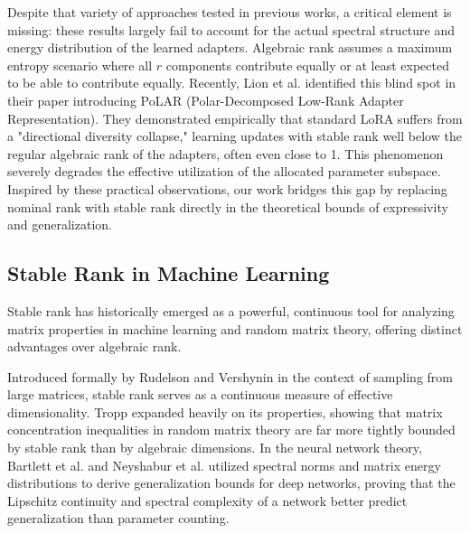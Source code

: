 \documentclass[a4paper,14pt]{extarticle}
\begin{document}
    Despite that variety of approaches tested in previous works, a critical element is missing: these results largely fail to account for the actual spectral structure and energy distribution of the learned adapters. Algebraic rank assumes a maximum entropy scenario where all $r$ components contribute equally or at least expected to be able to contribute equally. Recently, Lion et al. \cite{lion2025polar} identified this blind spot in their paper introducing PoLAR (Polar-Decomposed Low-Rank Adapter Representation). They demonstrated empirically that standard LoRA suffers from a "directional diversity collapse," learning updates with stable rank well below the regular algebraic rank of the adapters, often even close to 1. This phenomenon severely degrades the effective utilization of the allocated parameter subspace. Inspired by these practical observations, our work bridges this gap by replacing nominal rank with stable rank directly in the theoretical bounds of expressivity and generalization.


    \subsection{Stable Rank in Machine Learning}
    
    Stable rank has historically emerged as a powerful, continuous tool for analyzing matrix properties in machine learning and random matrix theory, offering distinct advantages over algebraic rank. 

    Introduced formally by Rudelson and Vershynin \cite{rudelson2007sampling} in the context of sampling from large matrices, stable rank serves as a continuous measure of effective dimensionality. Tropp \cite{tropp2012user, tropp2015introduction} expanded heavily on its properties, showing that matrix concentration inequalities in random matrix theory are far more tightly bounded by stable rank than by algebraic dimensions. In the neural network theory, Bartlett et al. \cite{bartlett2017spectrally} and Neyshabur et al. \cite{neyshabur2015norm} utilized spectral norms and matrix energy distributions to derive generalization bounds for deep networks, proving that the Lipschitz continuity and spectral complexity of a network better predict generalization than parameter counting.
\end{document}
